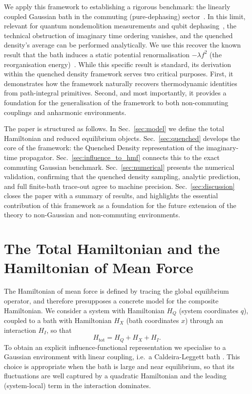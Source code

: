 \documentclass[aps,prl,twocolumn,superscriptaddress,showpacs,floatfix]{revtex4-2}
\begin{document}
We apply this framework to establishing a rigorous benchmark: the linearly coupled Gaussian bath in the commuting (pure-dephasing) sector~\cite{clerkIntroductionQuantumNoise2010,breuerTheoryOpenQuantum2002}. In this limit, relevant for quantum nondemolition measurements and qubit dephasing~\cite{makhlinQuantumStateEngineering2001,palmaQuantumComputersDissipation1996}, the technical obstruction of imaginary time ordering vanishes, and the quenched density's average can be performed analytically. We use this recover the known result that the bath induces a static potential renormalisation $-\lambda f^2$ (the reorganisation energy)~\cite{campisiTalknerHanggi2009Solvable}. While this specific result is standard, its derivation within the quenched density framework serves two critical purposes. First, it demonstrates how the framework naturally recovers thermodynamic identities from path-integral primitives. Second, and most importantly, it provides a foundation for the generalisation of the framework to both non-commuting couplings and anharmonic environments.

The paper is structured as follows. In Sec.~\ref{sec:model} we define the total Hamiltonian and reduced equilibrium objects. Sec.~\ref{sec:quenched} develops the core of the framework: the Quenched Density representation of the imaginary-time propagator. Sec.~\ref{sec:influence_to_hmf} connects this to the exact commuting Gaussian benchmark. Sec.~\ref{sec:numerical} presents the numerical validation, confirming that the quenched density sampling, analytic prediction, and full finite-bath trace-out agree to machine precision. Sec.~\ref{sec:discussion} closes the paper with a summary of results, and highlights the essential contribution of this framework as a foundation for the future extension of the theory to non-Gaussian and non-commuting environments.
 \section{\label{sec:model}The Total Hamiltonian and the Hamiltonian of Mean Force}
The Hamiltonian of mean force is defined by tracing the global equilibrium
operator, and therefore presupposes a concrete model for the composite
Hamiltonian. We consider a system with Hamiltonian $H_Q$ (system coordinates
$q$), coupled to a bath with Hamiltonian $H_X$ (bath coordinates $x$) through an
interaction $H_I$, so that
\begin{equation}
    H_{\mathrm{tot}}=H_Q+H_X+H_I.
    \label{eq:Htot_model}
\end{equation}
To obtain an explicit influence-functional representation we specialise to a
Gaussian environment with linear coupling, i.e.\ a Caldeira-Leggett bath \cite{caldeiraQuantumTunnellingDissipative1983a}. This
choice is appropriate when the bath is large and near equilibrium, so that its
fluctuations are well captured by a quadratic Hamiltonian and the leading
(system-local) term in the interaction dominates.
\end{document}

